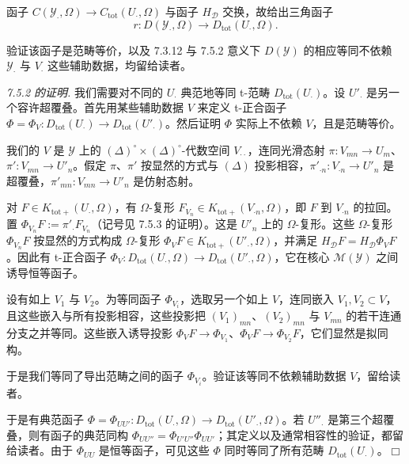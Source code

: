 函子 $C(\mathcal{Y}_{\cdot},\Omega)\to C_{\mathrm{tot}}(U_{\cdot},\Omega)$ 与函子 $H_{\mathcal{D}}$ 交换，故给出三角函子
\begin{equation}\tag{317}
r:D(\mathcal{Y}_{\cdot},\Omega)\to D_{\mathrm{tot}}(U_{\cdot},\Omega).
\end{equation}

验证该函子是范畴等价，以及 7.3.12 与 7.5.2 意义下 $D(\mathcal{Y})$ 的相应等同不依赖 $\mathcal{Y}_{\cdot}$ 与 $V_{\cdot}$ 这些辅助数据，均留给读者。

 \emph{7.5.2 的证明.} 我们需要对不同的 $U_{\cdot}$ 典范地等同 t-范畴 $D_{\mathrm{tot}}(U_{\cdot})$。设 $U'_{\cdot}$ 是另一个容许超覆叠。首先用某些辅助数据 $V$ 来定义 t-正合函子 $\Phi=\Phi_{V}:D_{\mathrm{tot}}(U_{\cdot})\to D_{\mathrm{tot}}(U'_{\cdot})$。然后证明 $\Phi$ 实际上不依赖 $V$，且是范畴等价。

我们的 $V$ 是 $\mathcal{Y}$ 上的 $(\Delta)^{\circ}\times(\Delta)^{\circ}$-代数空间 $V_{\cdot\cdot}$，连同光滑态射 $\pi:V_{mn}\to U_{m}$、$\pi':V_{mn}\to U'_{n}$。假定 $\pi$、$\pi'$ 按显然的方式与 $(\Delta)$ 投影相容，$\pi'_{\cdot n}:V_{\cdot n}\to U'_{n}$ 是超覆叠，$\pi'_{mn}:V_{mn}\to U'_{n}$ 是仿射态射。

对 $F\in K_{\mathrm{tot}+}(U_{\cdot},\Omega)$，有 $\Omega$-复形 $F_{V_{n}}\in K_{\mathrm{tot}+}(V_{\cdot n},\Omega)$，即 $F$ 到 $V_{\cdot n}$ 的拉回。置 $\Phi_{V_{n}}F:=\pi'_{\cdot}F_{V_{n}}$（记号见 7.5.3 的证明）。这是 $U'_{n}$ 上的 $\Omega$-复形。这些 $\Omega$-复形 $\Phi_{V_{n}}F$ 按显然的方式构成 $\Omega$-复形 $\Phi_{V}F\in K_{\mathrm{tot}+}(U'_{\cdot},\Omega)$，并满足 $H_{\mathcal{D}}F=H_{\mathcal{D}}\Phi_{V}F$。因此有 t-正合函子 $\Phi_{V}:D_{\mathrm{tot}}(U_{\cdot},\Omega)\to D_{\mathrm{tot}}(U'_{\cdot},\Omega)$，它在核心 $\mathcal{M}(\mathcal{Y})$ 之间诱导恒等函子。

设有如上 $V_{1}$ 与 $V_{2}$。为等同函子 $\Phi_{V_{i}}$，选取另一个如上 $V$，连同嵌入 $V_{1},V_{2}\subset V$，且这些嵌入与所有投影相容，这些投影把 $(V_{1})_{mn}$、$(V_{2})_{mn}$ 与 $V_{mn}$ 的若干连通分支之并等同。这些嵌入诱导投影 $\Phi_{V}F\to\Phi_{V_{1}}$、$\Phi_{V}F\to\Phi_{V_{2}}F$，它们显然是拟同构。


于是我们等同了导出范畴之间的函子 $\Phi_{V_{i}}$。验证该等同不依赖辅助数据 $V$，留给读者。

于是有典范函子 $\Phi=\Phi_{UU'}:D_{\mathrm{tot}}(U_{\cdot},\Omega)\to D_{\mathrm{tot}}(U'_{\cdot},\Omega)$。若 $U''_{\cdot}$ 是第三个超覆叠，则有函子的典范同构 $\Phi_{UU''}=\Phi_{U'U''}\Phi_{UU'}$；其定义以及通常相容性的验证，都留给读者。由于 $\Phi_{UU}$ 是恒等函子，可见这些 $\Phi$ 同时等同了所有范畴 $D_{\mathrm{tot}}(U_{\cdot})$。\hfill$\Box$

